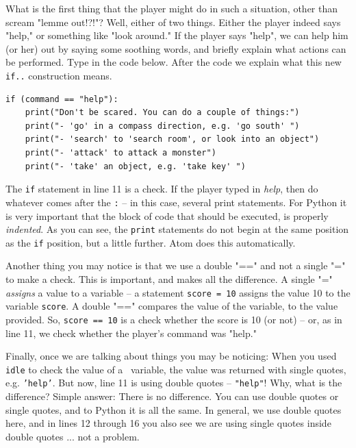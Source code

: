 What is the first thing that the player might do in such a situation, other than scream "lemme out!?!"? Well, either of two things. Either the player indeed says "help," or something like "look around." If the player says "help", we can help him (or her) out by saying some soothing words, and briefly explain what actions can be performed. Type in the code below. After the code we explain what this new \texttt{if..} construction means.   

\begin{lstlisting}[firstnumber=last]
if (command == "help"):
    print("Don't be scared. You can do a couple of things:")
    print("- 'go' in a compass direction, e.g. 'go south' ")
    print("- 'search' to 'search room', or look into an object")
    print("- 'attack' to attack a monster")
    print("- 'take' an object, e.g. 'take key' ")
\end{lstlisting}

The \texttt{if} statement in line 11 is a check. If the player typed in \textit{help}, then do whatever comes after the \texttt{:} -- in this case, several print statements. For Python it is very important that the block of code that should be executed, is properly \textit{indented}. As you can see, the \texttt{print} statements do not begin at the same position as the \texttt{if} position, but a little further. Atom does this automatically. 

Another thing you may notice is that we use a double "==" and not a single "=" to make a check. This is important, and makes all the difference. A single "=" \emph{assigns} a value to a variable -- a statement \texttt{score = 10} assigns the value 10 to the variable \texttt{score}. A double "==" compares the value of the variable, to the value provided. So, \texttt{score == 10} is a check whether the score is 10 (or not) -- or, as in line 11, we check whether the player's command was "help."   

\begin{Exp} 
Finally, once we are talking about things you may be noticing: When you used \texttt{idle} to check the value of a \strvar\ variable, the value was returned with single quotes, e.g. \texttt{'help'}. But now, line 11 is using double quotes -- \texttt{"help"}! Why, what is the difference? Simple answer: There is no difference. You can use double quotes or single quotes, and to Python it is all the same. In general, we use double quotes here, and in lines 12 through 16 you also see we are using single quotes inside double quotes ... not a problem. \expend 
\end{Exp}

